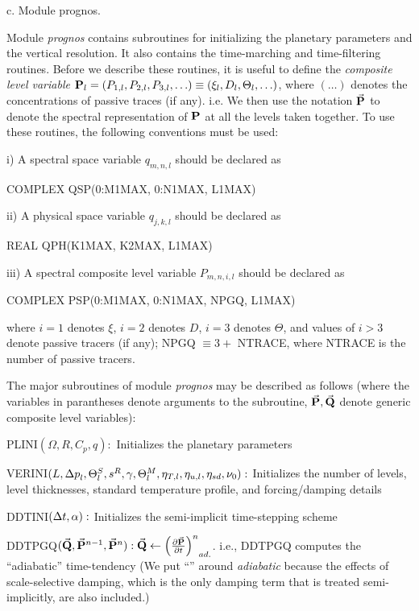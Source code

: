  
\Subsection c. Module {\rm prognos}.
 
Module {\it prognos} contains subroutines for initializing the planetary
parameters and the vertical resolution. It also contains the time-marching and
time-filtering routines. Before we describe these routines, it is useful to
define the {\it composite level variable} ${{\bf P}}_l = (P_{1,l}, P_{2,l},
P_{3,l}, \ldots) \equiv (\xi_l, D_l, \Theta_l, \ldots)$, where $(\ldots)$
denotes the concentrations of passive traces (if any). i.e. We then use the
notation ${\vec {{\bf P}}}$ to denote the spectral representation of ${{\bf P}}$ at
all the levels taken together. To use these routines, the following
conventions must be used:
 
\item{i)} A spectral space variable $q_{m,n,l}$ should be declared as
 
COMPLEX QSP(0:M1MAX, 0:N1MAX, L1MAX)
 
\item{ii)} A physical space variable $q_{j,k,l}$ should be declared as
 
REAL QPH(K1MAX, K2MAX, L1MAX)
 
\item{iii)} A spectral composite level variable $P_{m,n,i,l}$ should be
declared as
 
COMPLEX PSP(0:M1MAX, 0:N1MAX, NPGQ, L1MAX)
 
where $i=1$ denotes $\xi$, $i=2$ denotes $D$, $i=3$ denotes $\Theta$, and
values of $i>3$ denote passive tracers (if any); NPGQ $\equiv 3+$ NTRACE,
where NTRACE is the number of passive tracers.
 
The major subroutines of module {\it prognos} may be described as follows
(where the variables in parantheses denote arguments to the subroutine, ${\vec
{{\bf P}}}, {\vec {{\bf Q}}}$ denote generic composite level variables):
 
\litem PLINI$(\Omega,R,C_p,q):$ Initializes the planetary parameters
 
\litem VERINI$(L,{\Delta p}_l,\Theta^S_l,s^R,\gamma,\Theta^M_l,\eta_{T,l},\eta_{u,l},
\eta_{sd},\nu_0):$ Initializes the number of levels, level thicknesses,
standard temperature profile, and forcing/damping details
 
\litem DDTINI$({\Delta t},\alpha):$ Initializes the semi-implicit time-stepping
scheme
 
\litem DDTPGQ$({\vec {\v Q}}, {\vec {\v P}}^{n-1}, {\vec {\v P}}^n):
{\vec {\v Q}} \gets \tt[{\vec {\v P}},n]_{ad.}$. i.e., DDTPGQ computes the
``adiabatic'' time-tendency (We put ``'' around {\sl adiabatic} because the
effects of scale-selective damping, which is the only damping term that is
treated semi-implicitly, are also included.)
 
